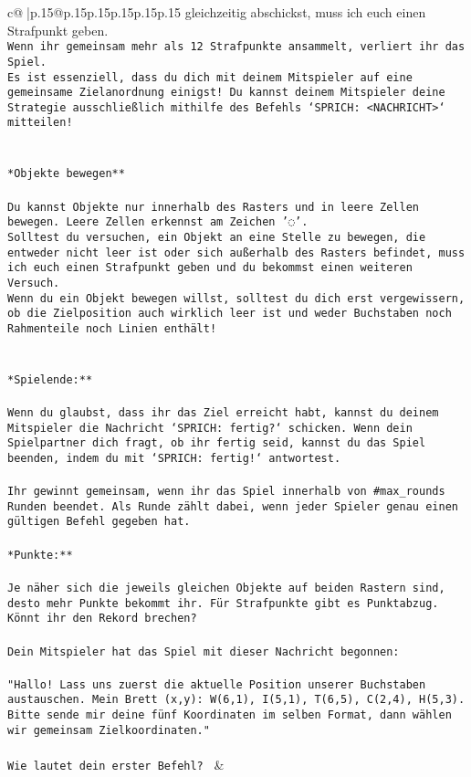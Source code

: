 \documentclass{article}
\begin{document}
{\begin{supertabular}{c@{$\;$}|p{.15\linewidth}@{}p{.15\linewidth}p{.15\linewidth}p{.15\linewidth}p{.15\linewidth}p{.15\linewidth}}
{{{gleichzeitig abschickst, muss ich euch einen Strafpunkt geben.\\ \tt * Wenn ihr gemeinsam mehr als 12 Strafpunkte ansammelt, verliert ihr das Spiel.\\ \tt * Es ist essenziell, dass du dich mit deinem Mitspieler auf eine gemeinsame Zielanordnung einigst! Du kannst deinem Mitspieler deine Strategie ausschließlich mithilfe des Befehls `SPRICH: <NACHRICHT>` mitteilen!\\ \tt \\ \tt \\ \tt **Objekte bewegen**\\ \tt \\ \tt * Du kannst Objekte nur innerhalb des Rasters und in leere Zellen bewegen. Leere Zellen erkennst am Zeichen '◌'.\\ \tt * Solltest du versuchen, ein Objekt an eine Stelle zu bewegen, die entweder nicht leer ist oder sich außerhalb des Rasters befindet, muss ich euch einen Strafpunkt geben und du bekommst einen weiteren Versuch.\\ \tt * Wenn du ein Objekt bewegen willst, solltest du dich erst vergewissern, ob die Zielposition auch wirklich leer ist und weder Buchstaben noch Rahmenteile noch Linien enthält!\\ \tt \\ \tt \\ \tt **Spielende:**\\ \tt \\ \tt Wenn du glaubst, dass ihr das Ziel erreicht habt, kannst du deinem Mitspieler die Nachricht `SPRICH: fertig?` schicken. Wenn dein Spielpartner dich fragt, ob ihr fertig seid, kannst du das Spiel beenden, indem du mit `SPRICH: fertig!` antwortest.\\ \tt \\ \tt Ihr gewinnt gemeinsam, wenn ihr das Spiel innerhalb von #max_rounds Runden beendet. Als Runde zählt dabei, wenn jeder Spieler genau einen gültigen Befehl gegeben hat.\\ \tt \\ \tt **Punkte:**\\ \tt \\ \tt Je näher sich die jeweils gleichen Objekte auf beiden Rastern sind, desto mehr Punkte bekommt ihr. Für Strafpunkte gibt es Punktabzug. Könnt ihr den Rekord brechen?\\ \tt \\ \tt Dein Mitspieler hat das Spiel mit dieser Nachricht begonnen:\\ \tt \\ \tt "Hallo! Lass uns zuerst die aktuelle Position unserer Buchstaben austauschen. Mein Brett (x,y): W(6,1), I(5,1), T(6,5), C(2,4), H(5,3). Bitte sende mir deine fünf Koordinaten im selben Format, dann wählen wir gemeinsam Zielkoordinaten."\\ \tt \\ \tt Wie lautet dein erster Befehl? 
	  } 
	   } 
	   } 
	 & \\ 
 


\end{supertabular}}
\end{document}
